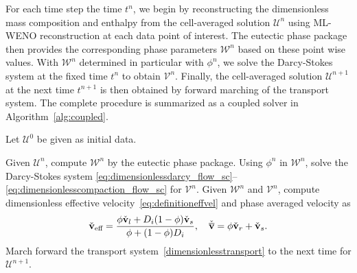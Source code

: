For each time step the time $t^n$, we begin by reconstructing the dimensionless mass composition
and enthalpy from the cell-averaged solution $\mathcal{U}^n$ using ML-WENO reconstruction at each data point of interest. 
The eutectic phase package then provides the corresponding phase parameters $\mathcal{W}^n$ 
based on these point wise values. With $\mathcal{W}^n$ determined in particular with $\phi^n$, we solve the Darcy-Stokes
system at the fixed time $t^n$ to obtain $\mathcal{V}^n$. Finally, the
cell-averaged solution $\mathcal{U}^{n+1}$ at the next time 
$t^{n+1}$ is then obtained by forward marching of the transport system.
The complete procedure is summarized as a coupled solver in Algorithm~\ref{alg:coupled}.

\begin{algorithm}[htb]
\caption{Sequential Coupled Solver\label{alg:coupled}}
		  Let $\mathcal{U}^0$ be given as initial data.
		  \vspace{0.2cm}
\begin{algorithmic} [1]


		  \vspace{0.3cm}
		  \State Given $\mathcal{U}^n$, compute $\mathcal{W}^n$ by the eutectic phase package.
		  \vspace{0.2cm}
\State Using $\phi^n$ in $\mathcal{W}^n$, solve the Darcy-Stokes system 
		  \eqref{eq:dimensionlessdarcy_flow_sc}--\eqref{eq:dimensionlesscompaction_flow_sc} for $\mathcal{V}^{n}$.
		  \vspace{0.2cm}
		  \State Given $\mathcal{W}^n$ and $\mathcal{V}^{n}$, compute dimensionless effective 
		  velocity~\eqref{eq:definitioneffvel} and phase averaged velocity as
\begin{equation*}
		  \check{\bold{v}}_{\text{eff}} = \frac{\phi \check{\bold{v}}_l + D_i(1-\phi) \check{\bold{v}}_s}{\phi + (1-\phi) D_i}, \quad \check{\overline{\bold{v}}} = \phi 
		  \check{\mathbf{v}}_r + \check{\mathbf{v}}_s.
\end{equation*}
		  \vspace{0.2cm}
		  \State March forward the transport system~\eqref{dimensionlesstransport} to the next time for $\mathcal{U}^{n+1}$.
		  \vspace{0.3cm}
\EndFor
\end{algorithmic}
\end{algorithm}

